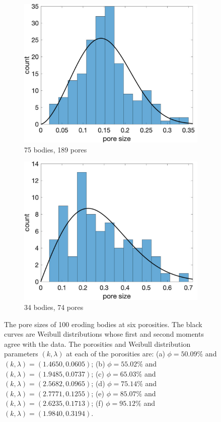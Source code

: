 \documentclass{jfm}
\begin{document}
\begin{figure}
\begin{subfigure}[b]{0.33\textwidth}
\includegraphics*[width =\linewidth]{./figs/hist100b_207}
\caption{75 bodies, 189 pores}
\end{subfigure}%
\begin{subfigure}[b]{0.33\textwidth}
\includegraphics*[width =\linewidth]{./figs/hist100b_246}
\caption{34 bodies, 74 pores}
\end{subfigure}
\caption{\label{fig:Eroding100gap_hist} The pore sizes of 100 eroding
bodies at six porosities. The black curves are Weibull distributions
whose first and second moments agree with the data. The porosities and
Weibull distribution parameters $(k,\lambda)$ at each of the porosities
are: (a) $\phi = 50.09\%$ and $(k,\lambda)=(1.4650,0.0605)$; (b) $\phi =
55.02\%$ and $(k,\lambda)=(1.9485,0.0737)$; (c) $\phi = 65.03\%$ and
$(k,\lambda)=(2.5682,0.0965)$; (d) $\phi = 75.14\%$ and
$(k,\lambda)=(2.7771,0.1255)$; (e) $\phi = 85.07\%$ and
$(k,\lambda)=(2.6235,0.1713)$; (f) $\phi = 95.12\%$ and
$(k,\lambda)=(1.9840,0.3194)$.}
\end{figure}
\end{document}

